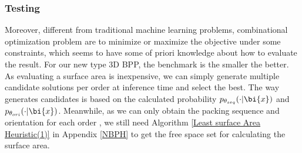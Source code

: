 \subsubsection{Testing}
\label{sec:test}
Moreover, different from traditional machine learning problems, combinational optimization problem are to minimize or maximize the objective under some constraints, which seems to have some of priori knowledge about how to evaluate the result.
 For our new type 3D BPP, the benchmark is the smaller the better. As evaluating a surface area is inexpensive, we can simply generate multiple candidate solutions per order at inference time and select the best. The way generates  candidates is based on the calculated probability $p_{\theta_{seq}}(\cdot|\bi{x})$ and $p_{\theta_{ori}}(\cdot|\bi{x})$. Meanwhile, as we can only obtain the packing sequence and orientation for each order , we still need Algorithm \ref{Least surface Area Heuristic(1)} in Appendix \ref{NBPH} to get the free space set for calculating the surface area.%

